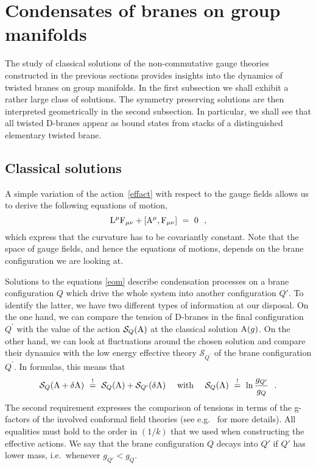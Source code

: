 \documentclass[12pt,a4paper]{article}
\def\cS{{\mathcal S}}
\def\tF{{\rm F}}
\def\tA{{\rm A}}
\def\tL{{\rm L}}
\begin{document}
\section{Condensates of branes on group manifolds}

The study of classical solutions of the non-commutative gauge 
theories constructed in the previous sections provides insights
into the dynamics of twisted branes on group manifolds. In the 
first subsection we shall exhibit a rather large class of 
solutions. The symmetry preserving solutions are then interpreted
geometrically in the second subsection. In particular, we shall 
see that all twisted D-branes appear as bound states from stacks 
of a distinguished elementary twisted brane.   

\subsection{\label{sc:Solutions}Classical solutions}

A simple  variation of the action~\eqref{effact} with respect to 
the gauge fields allows us to derive the following equations of 
motion, 
\begin{equation}
\label{eom}
\tL^{\mu}\tF_{\mu\nu}+[\tA^{\mu},\tF_{\mu\nu}]\ =\ 0 \ \ ,
\end{equation}
which express that the curvature has to be covariantly constant.
Note that the space of gauge fields, and hence the equations 
of motions, depends on the brane configuration we are looking at.
\smallskip 

Solutions to the equations \eqref{eom} describe condensation processes 
on a brane configuration $Q$ which drive the whole system into 
another configuration $Q'$. 
To identify the latter, we have two different types of information
at our disposal. On the one hand, we can compare the tension of 
D-branes in the final configuration $Q^\prime$ with the value of the 
action $\cS_Q(\tA)$  at the classical solution $\tA(g)$. On the other 
hand, we can look at fluctuations around the chosen solution and 
compare their dynamics with the low energy effective theory 
$\cS_{Q^\prime}$ of the brane configuration $Q^\prime$. In formulas, 
this means that 
\begin{equation}\label{fluctuation}
\cS_{Q} (\tA+\delta \tA)\ \overset{!}{=}\  \cS_{Q} (\tA) + 
\cS_{Q^\prime} (\delta \tA) \ \ \ \text{ with } \ \ \
\cS_Q(\tA) \ \overset{!}{=} \ \ln \frac{g_{Q^\prime}}{g_Q} 
\ \ . 
\end{equation}
The second requirement expresses the comparison of tensions in 
terms of the g-factors of the involved  conformal field theories
(see e.g.\ \cite{Alekseev:2000fd} for more details). All equalities  
must hold to the order in $(1/k)$ that we used when constructing 
the effective actions. We say that the brane configuration $Q$ decays
into $Q'$ if $Q'$ has lower mass, i.e.\ whenever $g_{Q'}<g_{Q}$. 
\end{document}
